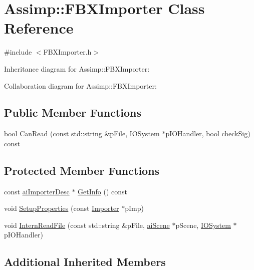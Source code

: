 \hypertarget{class_assimp_1_1_f_b_x_importer}{\section{Assimp\+:\+:F\+B\+X\+Importer Class Reference}
\label{class_assimp_1_1_f_b_x_importer}
}


{\ttfamily \#include $<$F\+B\+X\+Importer.\+h$>$}



Inheritance diagram for Assimp\+:\+:F\+B\+X\+Importer\+:


Collaboration diagram for Assimp\+:\+:F\+B\+X\+Importer\+:
\subsection*{Public Member Functions}
\begin{DoxyCompactItemize}
\item 
bool \hyperlink{class_assimp_1_1_f_b_x_importer_ac3d4ebf6c87167a5c509bc65909809be}{Can\+Read} (const std\+::string \&p\+File, \hyperlink{class_assimp_1_1_i_o_system}{I\+O\+System} $\ast$p\+I\+O\+Handler, bool check\+Sig) const 
\end{DoxyCompactItemize}
\subsection*{Protected Member Functions}
\begin{DoxyCompactItemize}
\item 
const \hyperlink{structai_importer_desc}{ai\+Importer\+Desc} $\ast$ \hyperlink{class_assimp_1_1_f_b_x_importer_a21defc65e3e3e00208c66ca0ea67f376}{Get\+Info} () const 
\item 
void \hyperlink{class_assimp_1_1_f_b_x_importer_aa0b027a6c4fe87c01dc43cacd2f17116}{Setup\+Properties} (const \hyperlink{class_assimp_1_1_importer}{Importer} $\ast$p\+Imp)
\item 
void \hyperlink{class_assimp_1_1_f_b_x_importer_aa6fff384b6fe9956ab68650d7f1e1848}{Intern\+Read\+File} (const std\+::string \&p\+File, \hyperlink{structai_scene}{ai\+Scene} $\ast$p\+Scene, \hyperlink{class_assimp_1_1_i_o_system}{I\+O\+System} $\ast$p\+I\+O\+Handler)
\end{DoxyCompactItemize}
\subsection*{Additional Inherited Members}


